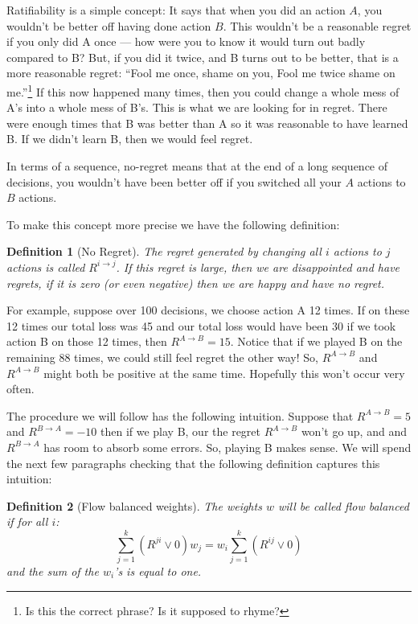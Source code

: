 \documentclass{book}
\newtheorem{definition}{Definition}[chapter]
\newcommand{\notes}{\index{personal notes}}
\begin{document}
Ratifiability is a simple concept: It says that when you did an
action $A$, you wouldn't be better off having done action $B$.  This
wouldn't be a reasonable regret if you only did A once --- how were
you to know it would turn out badly compared to B?  But, if you did it
twice, and B turns out to be better, that is a more reasonable regret:
``Fool me once, shame on you, Fool me twice shame on
me.''\footnote{\notes Is this the correct phrase?  Is it supposed to
  rhyme?} If this now happened many times, then you could change a
whole mess of A's into a whole mess of B's.  This is what we are
looking for in regret.  There were enough times that B was better than
A so it was reasonable to have learned B.  If we didn't learn B, then
we would feel regret.

In terms of a sequence, no-regret means that at the end of a long
sequence of decisions, you wouldn't have been better off if you
switched all your $A$ actions to $B$ actions.  

To make this concept more precise we have the following definition: 

\begin{definition}[No Regret]  The regret generated by changing all
$i$ actions to $j$ actions is called $ R^{i \rightarrow j}$.  If this
regret is large, then we are disappointed and have regrets, if it is
zero (or even negative) then we are happy and have no regret.
\end{definition}

For example, suppose over 100 decisions, we choose action A 12 times.
If on these 12 times our total loss was 45 and our total loss would
have been 30 if we took action B on those 12 times, then $R^{A
\rightarrow B} = 15$.  Notice that if we played B on the remaining 88
times, we could still feel regret the other way!  So, $R^{A
\rightarrow B}$ and $R^{A \rightarrow B}$ might both be positive at
the same time.  Hopefully this won't occur very often.

The procedure we will follow has the following intuition.  Suppose
that $R^{A \rightarrow B } = 5$ and $R^{B \rightarrow A} = -10$ then
if we play B, our the regret $R^{A \rightarrow B }$ won't go up, and
and $R^{B \rightarrow A}$ has room to absorb some errors.  So, playing
B makes sense.  We will spend the next few paragraphs checking that
the following definition captures this intuition:

\begin{definition}[Flow balanced weights]  The weights $w$ will be
called flow balanced if for all $i$:
$$ \sum_{j=1}^k \left(R^{ji} \vee 0 \right) w_j = w_i \sum_{j=1}^k
\left(R^{ij} \vee 0\right)$$
and the sum of the $w_i$'s is equal to one.
\end{definition}
\end{document}
